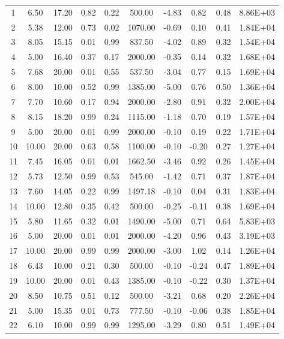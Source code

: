 \begin{landscape}
\begin{center}
\begin{longtable}{|c|c|c|c|c|c|c|c|c|c|}
1  & 6.50  & 17.20 & 0.82 & 0.22 & 500.00  & -4.83 & 0.82  & 0.48 & 8.86E+03 \\
2  & 5.38  & 12.00 & 0.73 & 0.02 & 1070.00 & -0.69 & 0.10  & 0.41 & 1.84E+04 \\
3  & 8.05  & 15.15 & 0.01 & 0.99 & 837.50  & -4.02 & 0.89  & 0.32 & 1.54E+04 \\
4  & 5.00  & 16.40 & 0.37 & 0.17 & 2000.00 & -0.35 & 0.14  & 0.32 & 1.68E+04 \\
5  & 7.68  & 20.00 & 0.01 & 0.55 & 537.50  & -3.04 & 0.77  & 0.15 & 1.69E+04 \\
6  & 8.00  & 10.00 & 0.52 & 0.99 & 1385.00 & -5.00 & 0.76  & 0.50 & 1.36E+04 \\
7  & 7.70  & 10.60 & 0.17 & 0.94 & 2000.00 & -2.80 & 0.91  & 0.32 & 2.00E+04 \\
8  & 8.15  & 18.20 & 0.99 & 0.24 & 1115.00 & -1.18 & 0.70  & 0.19 & 1.57E+04 \\
9  & 5.00  & 20.00 & 0.01 & 0.99 & 2000.00 & -0.10 & 0.19  & 0.22 & 1.71E+04 \\
10 & 10.00 & 20.00 & 0.63 & 0.58 & 1100.00 & -0.10 & -0.20 & 0.27 & 1.27E+04 \\
11 & 7.45  & 16.05 & 0.01 & 0.01 & 1662.50 & -3.46 & 0.92  & 0.26 & 1.45E+04 \\
12 & 5.73  & 12.50 & 0.99 & 0.53 & 545.00  & -1.42 & 0.71  & 0.37 & 1.87E+04 \\
13 & 7.60  & 14.05 & 0.22 & 0.99 & 1497.18 & -0.10 & 0.04  & 0.31 & 1.83E+04 \\
14 & 10.00 & 12.80 & 0.35 & 0.42 & 500.00  & -0.25 & -0.11 & 0.38 & 1.69E+04 \\
15 & 5.80  & 11.65 & 0.32 & 0.01 & 1490.00 & -5.00 & 0.71  & 0.64 & 5.83E+03 \\
16 & 5.00  & 20.00 & 0.01 & 0.01 & 2000.00 & -4.20 & 0.96  & 0.43 & 3.19E+03 \\
17 & 10.00 & 20.00 & 0.99 & 0.99 & 2000.00 & -3.00 & 1.02  & 0.14 & 1.26E+04 \\
18 & 6.43  & 10.00 & 0.21 & 0.30 & 500.00  & -0.10 & -0.24 & 0.47 & 1.89E+04 \\
19 & 10.00 & 20.00 & 0.01 & 0.43 & 1385.00 & -0.10 & -0.22 & 0.30 & 1.37E+04 \\
20 & 8.50  & 10.75 & 0.51 & 0.12 & 500.00  & -3.21 & 0.68  & 0.20 & 2.26E+04 \\
21 & 5.00  & 15.35 & 0.01 & 0.73 & 777.50  & -0.10 & -0.06 & 0.38 & 1.85E+04 \\
22 & 6.10  & 10.00 & 0.99 & 0.99 & 1295.00 & -3.29 & 0.80  & 0.51 & 1.49E+04 \\

\end{longtable}
\end{center}
\end{landscape}
